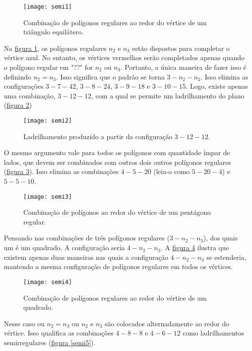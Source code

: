\begin{figure}[H]
\centering
\texttt{[image: semi1]}
\caption{Combinação de polígonos regulares ao redor do vértice de um triângulo equilátero.}
\label{semi1}
\end{figure}

Na \hyperref[semi1]{figura \ref{semi1}}, os polígonos regulares  $n_2$ e $n_3$ estão dispostos para completar o vértice azul. No entanto, os vértices vermelhos serão completados apenas quando o polígono regular em "$??$" for $n_2$ ou $n_3$. Portanto, a única maneira de fazer isso é definindo $n_2 = n_3$. Isso significa que o padrão se torna $3-n_2- n_2$. 
Isso elimina as configurações $3-7-42$, $3-8-24$, $3-9-18$ e $3-10-15$. Logo, existe apenas uma combinação, $3-12-12$, com a qual se permite um ladrilhamento do plano (\hyperref[semi2]{figura \ref{semi2}})

\begin{figure}[H]
\centering
\texttt{[image: semi2]}
\caption{Ladrilhamento produzido a partir da configuração $3-12-12$.}
\label{semi2}
\end{figure}

O mesmo argumento vale para todos os polígonos com quantidade ímpar de lados, que devem ser combinados com outros dois outros polígonos regulares (\hyperref[semi3]{figura \ref{semi3}}). Isso elimina as combinações $4-5-20$ (leia-o como $5-20-4$) e $5-5-10$.


\begin{figure}[H]
\centering
\texttt{[image: semi3]}
\caption{Combinação de polígonos ao redor do vértice de um pentágono regular.}
\label{semi3}
\end{figure}

Pensando nas combinações de três polígonos regulares  ($3-n_2-n_3$), dos quais um é um quadrado. A  configuração seria $4-n_2-n_3$. A \hyperref[semi4]{figura \ref{semi4}} ilustra que existem apenas duas maneiras nas quais a configuração $4-n_2-n_3$ se estenderia, mantendo a mesma configuração de polígonos regulares em todos os vértices. 

\begin{figure}[H]
\centering
\texttt{[image: semi4]}
\caption{Combinação de polígonos regulares ao redor do vértice de um quadrado.}
\label{semi4}
\end{figure}

Nesse caso ou $n_2= n_3$ ou $n_2$ e $n_3$ são colocados alternadamente ao redor do vértice. Isso qualifica as combinações $4-8-8$ e $4-6-12$ como ladrilhamentos semirregulares (\hyperref[semi5]{figura \ref{semi5}}).

